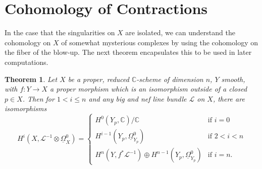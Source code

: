 \documentclass[proquest]{uwthesis}[2014/11/13]
\newtheorem{theorem}{Theorem}[section]
\theoremstyle{definition}
\newcommand{\CC}{\mathbb{C}}
\newcommand{\LL}{\mathcal{L}}
\newcommand{\DB}{\underline{\Omega}}
\begin{document}
\section{Cohomology of Contractions}
In the case that the singularities on $X$ are isolated, we can understand the cohomology on $X$ of somewhat mysterious complexes by using the cohomology on the fiber of the blow-up.
The next theorem encapsulates this to be used in later computations.
\begin{theorem}
	\label{thm:isosingcalc}
	Let $X$ be a proper, reduced $\CC$-scheme of dimension $n$, $Y$ smooth, with $f:Y \rightarrow X$ a proper morphism which is an isomorphism outside of a closed $p \in X$. Then for $1 < i \leq n$ and any big and nef line bundle $\LL$ on $X$, there are isomorphisms
	\[
		H^i(X, \LL^{-1} \otimes \DB_X^0) = \begin{cases} H^0(Y_p, \CC)/\CC & \text{if } i = 0 \\
		H^{i-1}(Y_p, \DB_{Y_p}^0) & \text{if } 2 < i < n \\
		H^n(Y, f^* \LL^{-1}) \oplus H^{n-1}(Y_p, \DB_{Y_p}^0) & \text{if } i = n.
		\end{cases}
	\]
\end{theorem}
\end{document}
